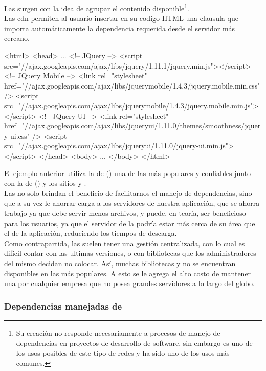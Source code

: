 Las \cdn surgen con la idea de agrupar el contenido disponible\footnote{
	Su creación no responde necesariamente a procesos de manejo de dependencias
	en proyectos de desarrollo de software, sin embargo es uno de los usos
	posibles de este tipo de redes y ha sido uno de los usos más comunes.
}.\\
Las \gls{cdn} permiten al usuario insertar en su codigo HTML una clausula que
importa automáticamente la dependencia requerida desde el servidor más cercano.
\\
\begin{htmlcode}[caption=Dependencias agregadas mediante \cdn]
<html>
	<head>
		...
		<!-- JQuery -->
		<script src="//ajax.googleapis.com/ajax/libs/jquery/1.11.1/jquery.min.js"></script>
		<!-- JQuery Mobile -->
		<link rel="stylesheet" href="//ajax.googleapis.com/ajax/libs/jquerymobile/1.4.3/jquery.mobile.min.css" />
		<script src="//ajax.googleapis.com/ajax/libs/jquerymobile/1.4.3/jquery.mobile.min.js"></script>
		<!-- JQuery UI -->
		<link rel="stylesheet" href="//ajax.googleapis.com/ajax/libs/jqueryui/1.11.0/themes/smoothness/jquery-ui.css" />
		<script src="//ajax.googleapis.com/ajax/libs/jqueryui/1.11.0/jquery-ui.min.js"></script>
	</head>
	<body>
		...
	</body>
</html>
\end{htmlcode}

El ejemplo anterior utiliza la \cdn de \citeauthor{GoogleCDN:ONLINE}
() una de las más populares y confiables junto con la de
\citeauthor{MicrosoftCDN:ONLINE} () y los sitios
 y .\\
Las \cdns no solo brindan el beneficio de facilitarnos el manejo de dependencias,
sino que a su vez le ahorrar carga a los servidores de nuestra aplicación, que se
ahorra trabajo ya que debe servir menos archivos, y puede, en teoría, ser beneficioso
para los usuarios, ya que el servidor de la \cdn podría estar más cerca de su área que
el de la aplicación, reduciendo los tiempos de descarga.\\
Como contrapartida, las \cdns suelen tener una gestión centralizada, con lo cual es
difícil contar con las ultimas versiones, o con bibliotecas que los administradores
del mismo decidan no colocar. Así, muchas bibliotecas y \frameworks no se encuentran
disponibles en las \cdns más populares. A esto se le agrega el alto costo de mantener
una \cdn por cualquier empresa que no posea grandes servidores a lo largo del globo.

\subsubsection{Dependencias manejadas de \viewtier}
\label{susubbsec:intro:jvm_dev:view_managed}

